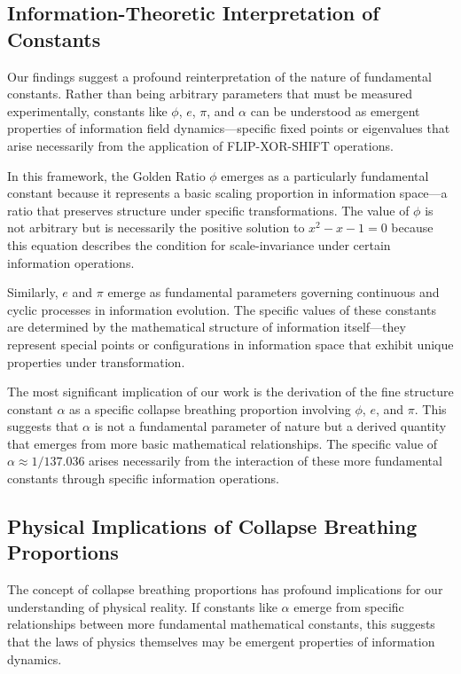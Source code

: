 \subsection{Information-Theoretic Interpretation of Constants}

Our findings suggest a profound reinterpretation of the nature of fundamental constants. Rather than being arbitrary parameters that must be measured experimentally, constants like $\phi$, $e$, $\pi$, and $\alpha$ can be understood as emergent properties of information field dynamics—specific fixed points or eigenvalues that arise necessarily from the application of FLIP-XOR-SHIFT operations.

In this framework, the Golden Ratio $\phi$ emerges as a particularly fundamental constant because it represents a basic scaling proportion in information space—a ratio that preserves structure under specific transformations. The value of $\phi$ is not arbitrary but is necessarily the positive solution to $x^2 - x - 1 = 0$ because this equation describes the condition for scale-invariance under certain information operations.

Similarly, $e$ and $\pi$ emerge as fundamental parameters governing continuous and cyclic processes in information evolution. The specific values of these constants are determined by the mathematical structure of information itself—they represent special points or configurations in information space that exhibit unique properties under transformation.

The most significant implication of our work is the derivation of the fine structure constant $\alpha$ as a specific collapse breathing proportion involving $\phi$, $e$, and $\pi$. This suggests that $\alpha$ is not a fundamental parameter of nature but a derived quantity that emerges from more basic mathematical relationships. The specific value of $\alpha \approx 1/137.036$ arises necessarily from the interaction of these more fundamental constants through specific information operations.

\subsection{Physical Implications of Collapse Breathing Proportions}

The concept of collapse breathing proportions has profound implications for our understanding of physical reality. If constants like $\alpha$ emerge from specific relationships between more fundamental mathematical constants, this suggests that the laws of physics themselves may be emergent properties of information dynamics.

